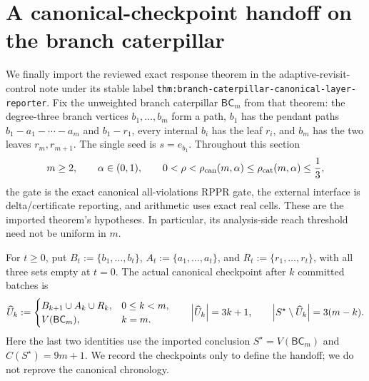 \section{A canonical-checkpoint handoff on the branch caterpillar}
\label{sec:branch-caterpillar-composite-handoff}

We finally import the reviewed exact response theorem in the
adaptive-revisit-control note under its stable label
\texttt{thm:branch-caterpillar-canonical-layer-reporter}.  Fix the unweighted
branch caterpillar $\mathsf{BC}_m$ from that theorem: the degree-three branch
vertices $b_1,\ldots,b_m$ form a path, $b_1$ has the pendant paths
$b_1-a_1-\cdots-a_m$ and $b_1-r_1$, every internal $b_i$ has the leaf $r_i$,
and $b_m$ has the two leaves $r_m,r_{m+1}$.  The single seed is
$s=e_{b_1}$.  Throughout this section
\begin{equation}
 m\geq2,
 \qquad \alpha\in(0,1),
 \qquad
 0<\rho<\rho_{\rm can}(m,\alpha)
 \leq\rho_{\rm cat}(m,\alpha)\leq\frac13,
 \label{eq:branch-caterpillar-composite-range}
\end{equation}
the gate is the exact canonical all-violations RPPR gate, the external
interface is delta/certificate reporting, and arithmetic uses exact real
cells.  These are the imported theorem's hypotheses.  In particular, its
analysis-side reach threshold need not be uniform in $m$.

For $t\geq0$, put
$B_t:=\{b_1,\ldots,b_t\}$,
$A_t:=\{a_1,\ldots,a_t\}$, and
$R_t:=\{r_1,\ldots,r_t\}$, with all three sets empty at $t=0$.  The actual
canonical checkpoint after $k$ committed batches is
\begin{equation}
 \widehat U_k:=
 \begin{cases}
  B_{k+1}\cup A_k\cup R_k,&0\leq k<m,\\
  V(\mathsf{BC}_m),&k=m.
 \end{cases}
 \qquad
 \left\lvert \widehat U_k \right\rvert=3k+1,
 \qquad
 \left\lvert S^\star\setminus\widehat U_k \right\rvert=3(m-k).
 \label{eq:branch-caterpillar-composite-checkpoints}
\end{equation}
Here the last two identities use the imported conclusion
$S^\star=V(\mathsf{BC}_m)$ and
$C(S^\star)=9m+1$.  We record the checkpoints only to define the handoff;
we do not reprove the canonical chronology.

